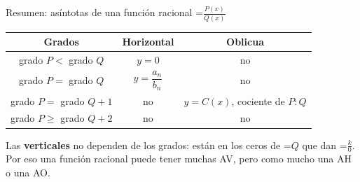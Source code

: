 \documentclass[11pt,a4paper]{article}
\newcommand{\lt}{<}\newcommand{\gt}{>}
\newcommand{\fmm}[1]{\setbox0=\hbox{$#1$}\ifdim\wd0>\linewidth\[#1\]\else\mbox{\box0}\fi}
\begin{document}
  
\begin{fmprop}{Resumen: asíntotas de una función racional \fmm{\frac{P(x)}{Q(x)}}}
\begin{center}\renewcommand{\arraystretch}{1.5}\begin{tabular}{ccc}\toprule
\textbf{Grados} & \textbf{Horizontal} & \textbf{Oblicua}\\\midrule
grado $P\lt$ grado $Q$ & $y=0$ & no\\
grado $P=$ grado $Q$ & $y=\dfrac{a_n}{b_n}$ & no\\
grado $P=$ grado $Q+1$ & no & $y=C(x)$, cociente de $P:Q$\\
grado $P\geq$ grado $Q+2$ & no & no\\
\bottomrule\end{tabular}\end{center}

      
\begin{fmnote}Las \textbf{verticales} no dependen de los grados: están en los ceros de \fmm{Q} que dan \fmm{\frac k0}. Por eso una función racional puede tener muchas AV, pero como mucho una AH o una AO.\end{fmnote}
\end{fmprop}

  
\end{document}
